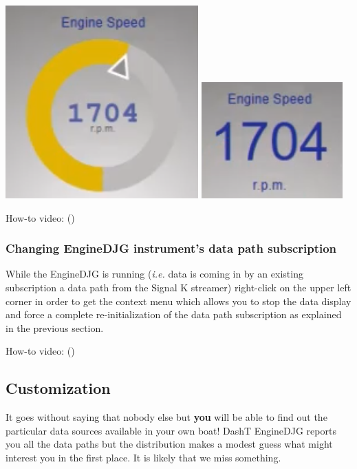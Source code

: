 \documentclass[11pt]{article}
\begin{document}
    \includegraphics{2020-02-15_EngineDJG_display_donut.png} \textbar{}
\includegraphics{2020-02-15_EngineDJG_display_simple.png}

    How-to video: ()

    \hypertarget{changing-enginedjg-instruments-data-path-subscription}{%
\subsubsection{Changing EngineDJG instrument's data path
subscription}\label{changing-enginedjg-instruments-data-path-subscription}}

    While the EngineDJG is running (\emph{i.e.} data is coming in by an
existing subscription a data path from the Signal K streamer)
right-click on the upper left corner in order to get the context menu
which allows you to stop the data display and force a complete
re-initialization of the data path subscription as explained in the
previous section.

    How-to video: ()

    \hypertarget{customization}{%
\subsection{Customization}\label{customization}}

    It goes without saying that nobody else but \textbf{you} will be able to
find out the particular data sources available in your own boat! DashT
EngineDJG reports you all the data paths but the distribution makes a
modest guess what might interest you in the first place. It is likely
that we miss something.
\end{document}
